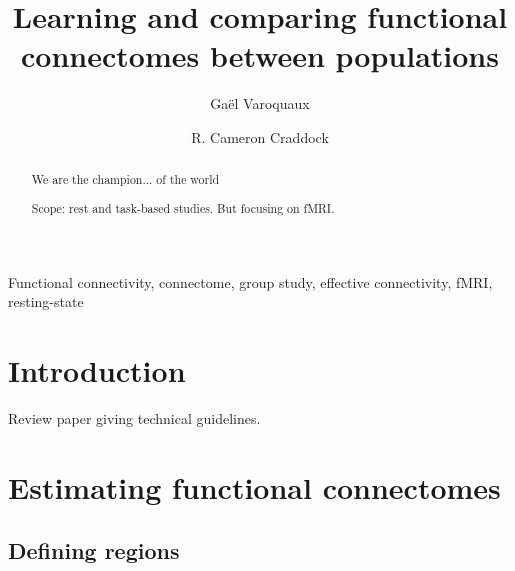 \documentclass[5p]{elsarticle}
\begin{document}
\title{Learning and comparing functional connectomes between populations}


\author[parietal,unicog,cea]{Ga\"el Varoquaux}
\author[cmi,nki]{R. Cameron Craddock}


\address[parietal]{Parietal project-team, INRIA Saclay-\^ile de France}
\address[unicog]{INSERM, U992}
\address[cea]{CEA/Neurospin b\^at 145, 91191 Gif-Sur-Yvette}
\address[cmi]{Child Mind Institute, New York, New York}
\address[nki]{Nathan Kline Institute for Psychiatric Research, Orangeburg, New York}

\begin{abstract}
    We are the champion... of the world

    Scope: rest and task-based studies. But focusing on fMRI.
\end{abstract}

\begin{keyword}
    Functional connectivity, connectome, group study, effective
    connectivity, fMRI, resting-state
\end{keyword}

\maketitle

\sloppy %
\section{Introduction}

Review paper giving technical guidelines.


\section{Estimating functional connectomes}

\subsection{Defining regions}
\end{document}
